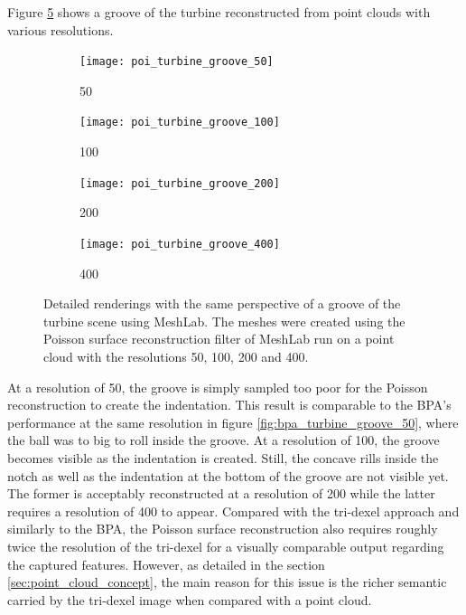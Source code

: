 Figure \ref{fig:poi_grooves} shows a groove of the turbine reconstructed from point clouds with various resolutions.
%
\begin{figure}
	\begin{subfigure}[b]{0.24\textwidth}
		\centering
		\texttt{[image: poi\_turbine\_groove\_50]}
		\caption{50}
		\label{fig:poi_turbine_groove_50}
	\end{subfigure}
	\begin{subfigure}[b]{0.24\textwidth}
		\centering
		\texttt{[image: poi\_turbine\_groove\_100]}
		\caption{100}
		\label{fig:poi_turbine_groove_100}
	\end{subfigure}
	\begin{subfigure}[b]{0.24\textwidth}
		\centering
		\texttt{[image: poi\_turbine\_groove\_200]}
		\caption{200}
		\label{fig:poi_turbine_groove_200}
	\end{subfigure}
	\begin{subfigure}[b]{0.24\textwidth}
		\centering
		\texttt{[image: poi\_turbine\_groove\_400]}
		\caption{400}
		\label{fig:poi_turbine_groove_400}
	\end{subfigure}
	\caption{
		Detailed renderings with the same perspective of a groove of the turbine scene using MeshLab.
		The meshes were created using the Poisson surface reconstruction filter of MeshLab run on a point cloud with the resolutions 50, 100, 200 and 400.
	}
	\label{fig:poi_grooves}
\end{figure}
%
At a resolution of 50, the groove is simply sampled too poor for the Poisson reconstruction to create the indentation.
This result is comparable to the BPA's performance at the same resolution in figure \ref{fig:bpa_turbine_groove_50}, where the ball was to big to roll inside the groove.
At a resolution of 100, the groove becomes visible as the indentation is created.
Still, the concave rills inside the notch as well as the indentation at the bottom of the groove are not visible yet.
The former is acceptably reconstructed at a resolution of 200 while the latter requires a resolution of 400 to appear.
Compared with the tri-dexel approach and similarly to the BPA, the Poisson surface reconstruction also requires roughly twice the resolution of the tri-dexel for a visually comparable output regarding the captured features.
However, as detailed in the section \ref{sec:point_cloud_concept}, the main reason for this issue is the richer semantic carried by the tri-dexel image when compared with a point cloud.

